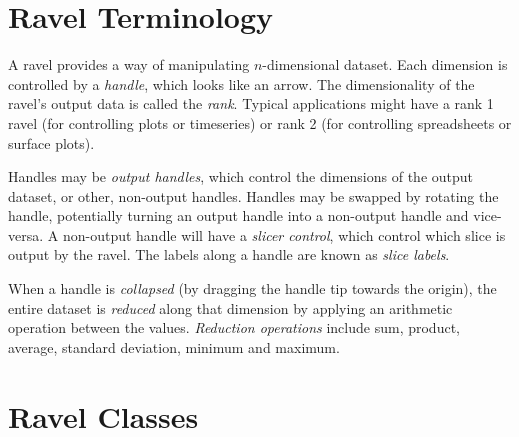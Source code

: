 \documentclass{article}
\begin{document}
\section{Ravel Terminology}

A ravel provides a way of manipulating $n$-dimensional dataset. Each
dimension is controlled by a {\em handle}, which looks like an
arrow. The dimensionality of the ravel's output data is called the
{\em rank}. Typical applications might have a rank 1 ravel (for
controlling plots or timeseries) or rank 2 (for controlling
spreadsheets or surface plots).

Handles may be {\em output handles}, which control the dimensions of
the output dataset, or other, non-output handles. Handles may
be swapped by rotating the handle, potentially turning an output
handle into a non-output handle and vice-versa. A non-output handle
will have a {\em slicer control}, which control which slice is output
by the ravel. The labels along a handle are known as {\em slice labels}.

When a handle is {\em collapsed} (by dragging the handle tip towards
the origin), the entire dataset is {\em reduced} along that dimension
by applying an arithmetic operation between the values. {\em Reduction
operations} include sum, product, average, standard deviation, minimum
and maximum.

\section{Ravel Classes}

\end{document}
